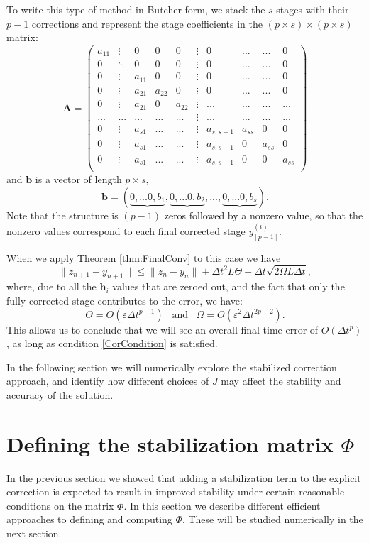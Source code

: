 \documentclass{siamart251104}
\newcommand{\dt}{\Delta t}
\newcommand{\m}[1]{\mathbf{#1}}
\newcommand{\vb}{\m{b}}
\newcommand{\vh}{\m{h}}
\newcommand{\mA}{\m{A}}
\begin{document}
To write this type of method in Butcher form, 
we stack the $s$ stages with their $p-1$ corrections 
and represent the  stage coefficients in the $(p\times s) \times (p\times s)$ matrix:
\[ \mA = \left(
\begin{array}{cccccccccc}
a_{11} & \vdots & 0 & 0 & 0 &\vdots & 0 & ... & ...& 0 \\
0 & \ddots &  0 & 0 & 0 &\vdots & 0 &... & ... & 0 \\
0 & \vdots & a_{11} &  0 & 0 &\vdots & 0 & ... & ... & 0 \\
0 & \vdots & a_{21} & a_{22} & 0 &\vdots  & 0  & ... & ... & 0 \\ 
0 & \vdots & a_{21} & 0 & a_{22} &\vdots & ... & ... & ...& ...\\ 
... & ... & ... & ... & ... &\vdots  & ... & ... & ... & ...\\
0 & \vdots & a_{s1} & ... &  ... & \vdots & a_{s,s-1}  & a_{ss} & 0 & 0 \\
0 & \vdots & a_{s1} & ... &  ... & \vdots & a_{s,s-1} & 0 & a_{ss} & 0 \\
0 & \vdots & a_{s1} & ... &  ... & \vdots & a_{s,s-1} & 0 & 0 & a_{ss} \\
\end{array}
\right)
\]
and $\vb$ is a vector of length $p \times s$,  
\[\vb = \left( \underbrace{0, ... 0 ,b_1}, \underbrace{0, ... 0 , b_2}, ...,  \underbrace{0, ... 0 , b_s} \right).\]
Note that the structure is $(p-1)$ zeros followed by a nonzero value,
so that the nonzero values correspond to each 
final corrected stage $ y^{(i)}_{[p-1]}$.

When we apply Theorem \ref{thm:FinalConv} to this case 
we have
\[ \|z_{n+1} - y_{n+1}\| \leq \|z_n - y_n\|
+ \dt^2 L \Theta +  \dt \sqrt{2 \Omega L \dt} ,\]
where, due to all the $\vh_i$ values that are zeroed out,
and the fact that only the fully corrected stage 
contributes to the error, we have:
\[  \Theta = O(\varepsilon \dt^{p-1}) \; \; \; 
\mbox{and}  \; \; \; 
 \Omega =   O(\varepsilon^2 \dt^{2 p-2}) . \]
This allows us to conclude that we will see an overall final time error
of  $O(\dt^{p})$, as long as condition \eqref{CorCondition} is satisfied.

In the following section we will numerically explore the stabilized correction approach, and identify how different choices of $J$ may affect the stability and accuracy of the solution.



\section{Defining the stabilization matrix $\Phi$}
\label{sec:phi}
In the previous section we showed that adding a stabilization 
term to the explicit correction is expected to result in improved 
stability under certain reasonable conditions on the matrix $\Phi$.
In this section we describe different 
efficient approaches to defining and computing  $\Phi$.
These will be studied numerically in the next section.
\end{document}
